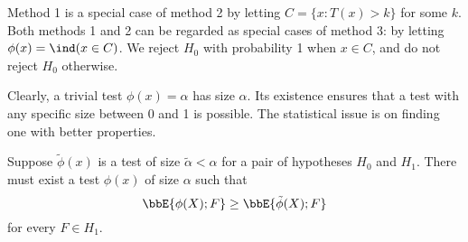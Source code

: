 Method 1 is a special case of method 2 by letting $C = \{ x: T(x) > k \}$
for some $k$. 
Both methods 1 and 2 can be regarded as special cases of method 3:
by letting $\phi(x) = \ind ( x \in C)$.
We reject $H_0$ with probability 1 when $x \in C$, 
and do not reject $H_0$ otherwise.

Clearly, a trivial test $\phi(x) = \alpha$ has size $\alpha$.
Its existence ensures that a test with any specific size
between 0 and 1 is possible.
The statistical issue is on finding one with better properties.

Suppose $\tilde \phi(x)$ is a test of size $\tilde \alpha < \alpha$
for a pair of hypotheses $H_0$ and $H_1$. There
must exist a test $\phi(x)$ of size $\alpha$ such that
\[
\bbE \{ \phi(X); F\} \geq \bbE \{ \tilde \phi(X); F\}
\]
for every $F \in H_1$. 
